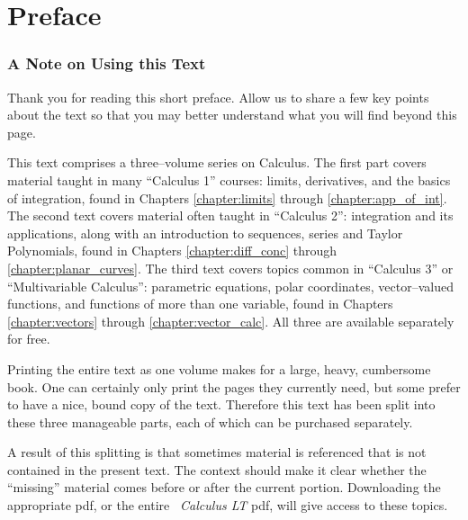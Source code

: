 \prefacegeometry
\chapter*{Preface}
\thispagestyle{empty}

\subsection{A Note on Using this Text}

Thank you for reading this short preface. Allow us to share a few key points about the text so that you may better understand what you will find beyond this page.

This text comprises a three--volume series on Calculus.
The first part covers material taught in many ``Calculus 1'' courses: limits, derivatives, and the basics of integration, found in Chapters \ref{chapter:limits} through \ref{chapter:app_of_int}. The second text covers material often taught in ``Calculus 2'': integration and its applications, along with an introduction to sequences, series and Taylor Polynomials, found in Chapters \ref{chapter:diff_conc} through \ref{chapter:planar_curves}. The third text covers topics common in ``Calculus 3'' or ``Multivariable Calculus'': parametric equations, polar coordinates, vector--valued functions, and functions of more than one variable, found in Chapters \ref{chapter:vectors} through \ref{chapter:vector_calc}. All three are available separately for free.

Printing the entire text as one volume makes for a large, heavy, cumbersome book. One can certainly only print the pages they currently need, but some prefer to have a nice, bound copy of the text. Therefore this text has been split into these three manageable parts, each of which can be purchased separately.%

A result of this splitting is that sometimes material is referenced that is not contained in the present text. The context should make it clear whether the ``missing'' material comes before or after the current portion. Downloading the appropriate pdf, or the entire \textit{\apex\ Calculus LT} pdf, will give access to these topics.

